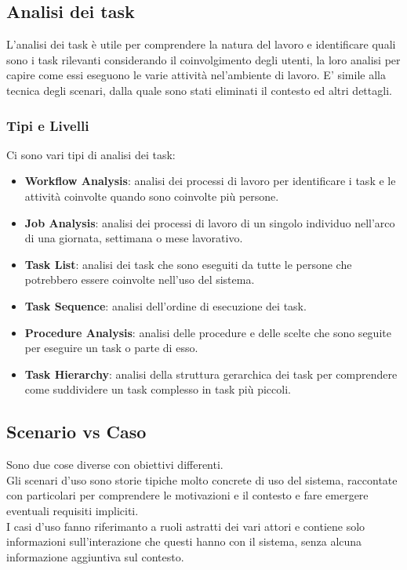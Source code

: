 \documentclass{report}
\begin{document}
	\subsection{Analisi dei task}
	L'analisi dei task è utile per comprendere la natura del lavoro e identificare quali sono i task rilevanti considerando il coinvolgimento degli utenti, la loro analisi per capire come essi eseguono le varie attività nel'ambiente di lavoro. E' simile alla tecnica degli scenari, dalla quale sono stati eliminati il contesto ed altri dettagli.

	\subsubsection{Tipi e Livelli}
	Ci sono vari tipi di analisi dei task:
	\begin{itemize}
		\item \textbf{Workflow Analysis}: analisi dei processi di lavoro per identificare i task e le attività coinvolte quando sono coinvolte  più persone.
		\item \textbf{Job Analysis}: analisi dei processi di lavoro di un singolo individuo nell'arco di una giornata, settimana o mese lavorativo.
		\item \textbf{Task List}: analisi dei task che sono eseguiti da tutte le persone che potrebbero essere coinvolte nell'uso del sistema.
		\item \textbf{Task Sequence}: analisi dell'ordine di esecuzione dei task.
		\item \textbf{Procedure Analysis}: analisi delle procedure e delle scelte che sono seguite per eseguire un task o parte di esso.
		\item \textbf{Task Hierarchy}: analisi della struttura gerarchica dei task per comprendere come suddividere un task complesso in task più piccoli.
	\end{itemize}

	\subsection{Scenario vs Caso}
	Sono due cose diverse con obiettivi differenti.\\
	Gli scenari d'uso sono storie tipiche molto concrete di uso del sistema, raccontate con particolari per comprendere le motivazioni e il contesto e fare emergere eventuali requisiti impliciti.\\
	I casi d'uso fanno riferimanto a ruoli astratti dei vari attori e contiene solo informazioni sull'interazione che questi hanno con il sistema, senza alcuna informazione aggiuntiva sul contesto.
	
\end{document}
